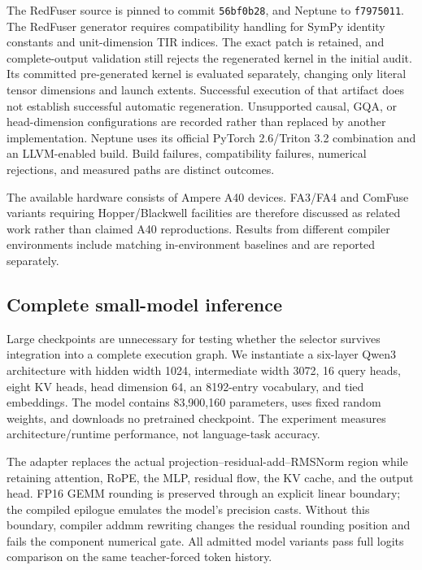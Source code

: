 The RedFuser source is pinned to commit \texttt{56bf0b28}, and Neptune to \texttt{f7975011}.
The RedFuser generator requires compatibility handling for SymPy identity constants and unit-dimension TIR indices.
The exact patch is retained, and complete-output validation still rejects the regenerated kernel in the initial audit.
Its committed pre-generated kernel is evaluated separately, changing only literal tensor dimensions and launch extents.
Successful execution of that artifact does not establish successful automatic regeneration.
Unsupported causal, GQA, or head-dimension configurations are recorded rather than replaced by another implementation.
Neptune uses its official PyTorch 2.6/Triton 3.2 combination and an LLVM-enabled build.
Build failures, compatibility failures, numerical rejections, and measured paths are distinct outcomes.

The available hardware consists of Ampere A40 devices.
FA3/FA4 and ComFuse variants requiring Hopper/Blackwell facilities are therefore discussed as related work rather than claimed A40 reproductions.
Results from different compiler environments include matching in-environment baselines and are reported separately.

\subsection{Complete small-model inference}
\label{sec:small-system}

Large checkpoints are unnecessary for testing whether the selector survives integration into a complete execution graph.
We instantiate a six-layer Qwen3 architecture with hidden width 1024, intermediate width 3072, 16 query heads, eight KV heads, head dimension 64, an 8192-entry vocabulary, and tied embeddings.
The model contains 83,900,160 parameters, uses fixed random weights, and downloads no pretrained checkpoint.
The experiment measures architecture/runtime performance, not language-task accuracy.

The adapter replaces the actual projection--residual-add--RMSNorm region while retaining attention, RoPE, the MLP, residual flow, the KV cache, and the output head.
FP16 GEMM rounding is preserved through an explicit linear boundary; the compiled epilogue emulates the model's precision casts.
Without this boundary, compiler addmm rewriting changes the residual rounding position and fails the component numerical gate.
All admitted model variants pass full logits comparison on the same teacher-forced token history.

